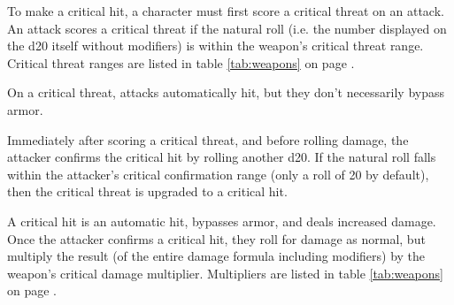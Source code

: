 \begin{multicols*}{2}
    To make a critical hit, a character must first score a critical
    threat on an attack. An attack scores a critical
    threat if the natural roll (i.e. the number displayed on the d20 itself
    without modifiers) is within the weapon's critical threat
    range. Critical threat ranges are listed in
    table \ref{tab:weapons} on page \pageref{tab:weapons}.

    On a critical threat, attacks automatically hit, but they don't necessarily
    bypass armor.

    Immediately after scoring a critical threat, and before rolling damage, the
    attacker confirms the critical hit by rolling
    another d20. If the natural roll falls within the attacker's critical
    confirmation range (only a roll
    of 20 by default), then the critical threat is upgraded to a critical hit.

    A critical hit is an automatic hit, bypasses armor, and deals increased
    damage. Once the attacker confirms a critical hit, they roll for damage
    as normal, but multiply the result (of the entire damage formula including
    modifiers) by the weapon's critical damage
    multiplier. Multipliers are
    listed in table \ref{tab:weapons} on page \pageref{tab:weapons}.
\end{multicols*}
